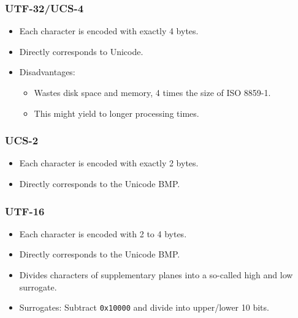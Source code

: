             \subsubsection{UTF-32/UCS-4} %
                \begin{itemize}
                	\item Each character is encoded with exactly 4 bytes.
                	\item Directly corresponds to Unicode.
                	\item Disadvantages:
                		\begin{itemize}
                			\item Wastes disk space and memory, 4 times the size of ISO 8859-1.
                			\item This might yield to longer processing times.
                		\end{itemize}
                \end{itemize}

            \subsubsection{UCS-2} %
                \begin{itemize}
                	\item Each character is encoded with exactly 2 bytes.
                	\item Directly corresponds to the Unicode BMP.
                \end{itemize}

            \subsubsection{UTF-16} %
                \begin{itemize}
                	\item Each character is encoded with 2 to 4 bytes.
                	\item Directly corresponds to the Unicode BMP.
                	\item Divides characters of supplementary planes into a so-called high and low surrogate.
                	\item Surrogates: Subtract \texttt{0x10000} and divide into upper/lower 10 bits.
                \end{itemize}

